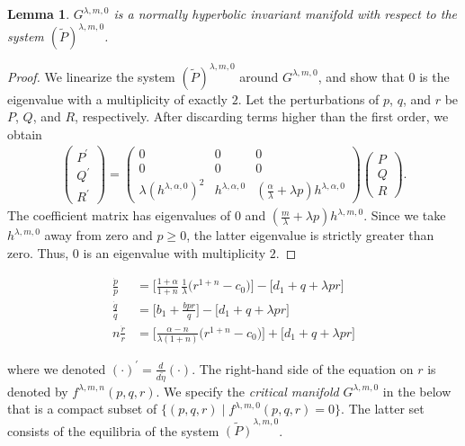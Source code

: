 \documentclass[a4paper,11pt]{article}
\def\dpp{\dot{p}}
\def\dqq{\dot{q}}
\def\drr{\dot{r}}
\newtheorem{lemma}{Lemma}[section]
\begin{document}
\begin{lemma} \label{lem:normal_hyper}
 $G^{\lambda,m,0}$ is a normally hyperbolic invariant manifold with respect to the system $(\tilde{P})^{ \lambda,m,0}$.
\end{lemma}
\begin{proof}
We linearize the system $(\tilde{P})^{ \lambda,m,0}$ around $G^{\lambda,m,0}$, and show that $0$ is the eigenvalue with a multiplicity of exactly $2$. Let the perturbations of $p$, $q$, and $r$ be $P$, $Q$, and $R$, respectively. After discarding  terms higher than the first order, we obtain
\begin{align*}
 \begin{pmatrix} {P}^\prime\\ {Q}^\prime \\ {R}^\prime \end{pmatrix} =
 \begin{pmatrix} 0 & 0& 0\\ 0 & 0 & 0\\ \lambda (h^{\lambda,\alpha,0})^2 & h^{\lambda,\alpha,0} & ( \frac{\alpha}{ \lambda} + \lambda p )h^{\lambda,\alpha,0} \end{pmatrix} \begin{pmatrix} {P}\\ {Q} \\ {R} \end{pmatrix}.
\end{align*}
The coefficient matrix has eigenvalues of $0$ and $( \frac{m}{ \lambda} + \lambda p )h^{\lambda,m,0}$. Since we take $h^{\lambda,m,0}$ away from zero and $p \ge 0$, the latter eigenvalue is strictly greater than zero. Thus, $0$ is an eigenvalue with multiplicity $2$. %
\end{proof}



\begin{align*}
 \frac{\dpp}{p}&=\Big[\frac{1+\alpha}{1+n}\,\frac{1}{\lambda }\Big(r^{1+n}-c_0\Big)\Big] -\Big[d_1 + q + \lambda pr\Big]\\
 \frac{\dqq}{q}&=\Big[b_1 +\frac{bpr}{q}\Big] -\Big[d_1 + q + \lambda pr\Big]\\
 n\frac{\drr}{r}&=\Big[\frac{\alpha-n}{\lambda(1+n)}\Big(r^{1+n}-c_0\Big)\Big]+\Big[d_1 + q + \lambda pr\Big]
\end{align*}

\noindent where we denoted $(\cdot)^\prime = \frac{d}{d\tilde{\eta}}(\cdot)$. 
The right-hand side of the equation on $r$ is denoted by $f^{\lambda,m,n}(p,q,r)$. We specify the {\it critical manifold} $G^{\lambda,m,0}$ in the below that is a compact subset of $\{(p,q,r)\;|\; f^{\lambda,m,0}(p,q,r)=0\}$. The latter set consists of the equilibria of the system $\tilde{(P)}^{\lambda,m,0}$. 
\end{document}
